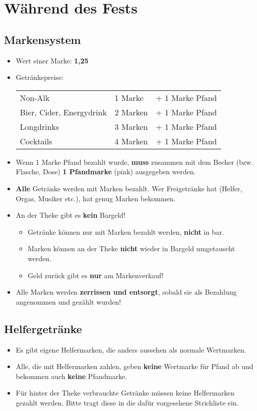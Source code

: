 \section{Während des Fests}
\subsection{Markensystem}
\begin{itemize}
  \item Wert einer Marke: {\large\textbf{1,25\EUR}}
  \item Getränkepreise:

    \begin{tabular}{lll}
      Non-Alk & 1 Marke & + 1 Marke Pfand \\
      Bier, Cider, Energydrink & 2 Marken & + 1 Marke Pfand \\
      Longdrinks & 3 Marken & + 1 Marke Pfand \\
      Cocktails & 4 Marken & + 1 Marke Pfand
    \end{tabular}
  \item Wenn 1 Marke Pfand bezahlt wurde, \textbf{muss} zusammen mit dem Becher (bzw. Flasche, Dose) \textbf{1 Pfandmarke} (pink) ausgegeben werden.
  \item \textbf{Alle} Getränke werden mit Marken bezahlt. Wer Freigetränke hat (Helfer, Orgas, Musiker etc.), hat genug Marken bekommen.
  \item An der Theke gibt es \textbf{kein} Bargeld!
    \begin{itemize}
      \item Getränke können nur mit Marken bezahlt werden, \textbf{nicht} in bar.
      \item Marken können an der Theke \textbf{nicht} wieder in Bargeld umgetauscht werden.
      \item Geld zurück gibt es \textbf{nur} am Markenverkauf!
    \end{itemize}
  \item Alle Marken werden \textbf{zerrissen und entsorgt}, sobald sie als Bezahlung angenommen und gezählt wurden!
\end{itemize}
\subsection{Helfergetränke}
\begin{itemize}
  \item Es gibt eigene Helfermarken, die anders aussehen als normale Wertmarken.
  \item Alle, die mit Helfermarken zahlen, geben \textbf{keine} Wertmarke für Pfand ab und bekommen auch \textbf{keine} Pfandmarke.
  \item Für hinter der Theke verbrauchte Getränke müssen keine Helfermarken gezahlt werden. Bitte tragt diese in die dafür vorgesehene Strichliste ein.
\end{itemize}
